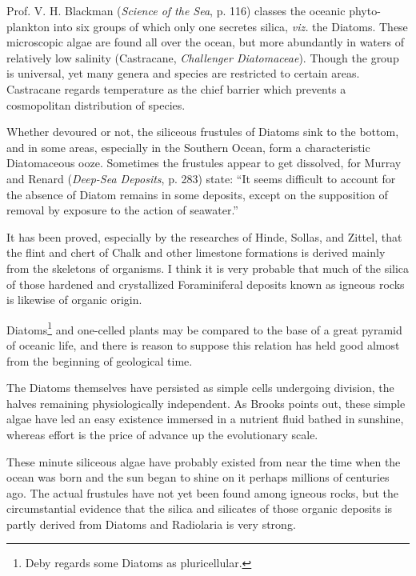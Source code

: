 \documentclass[a4paper, 12pt, oneside, landscape]{article}
\begin{document}
Prof. V. H. Blackman (\emph{Science of the Sea}, p. 116) classes the oceanic phyto-plankton into six groups of which only one secretes silica, \emph{viz.} the Diatoms. These microscopic algae are found all over the ocean, but more abundantly in waters of relatively low salinity (Castracane, \emph{Challenger Diatomaceae}). Though the group is universal, yet many genera and species are restricted to certain areas. Castracane regards temperature as the chief barrier which prevents a cosmopolitan distribution of species.

Whether devoured or not, the siliceous frustules of Diatoms sink to the bottom, and in some areas, especially in the Southern Ocean, form a characteristic Diatomaceous ooze. Sometimes the frustules appear to get dissolved, for Murray and Renard (\emph{Deep-Sea Deposits}, p. 283) state: ``It seems difficult to account for the absence of Diatom remains in some deposits, except on the supposition of removal by exposure to the action of seawater.''

It has been proved, especially by the researches of Hinde, Sollas, and Zittel, that the flint and chert of Chalk and other limestone formations is derived mainly from the skeletons of organisms. I think it is very probable that much of the silica of those hardened and crystallized Foraminiferal deposits known as igneous rocks is likewise of organic origin.

Diatoms\footnote{Deby regards some Diatoms as pluricellular.} and one-celled plants may be compared to the base of a great pyramid of oceanic life, and there is reason to suppose this relation has held good almost from the beginning of geological time.

The Diatoms themselves have persisted as simple cells undergoing division, the halves remaining physiologically independent. As Brooks points out, these simple algae have led an easy existence immersed in a nutrient fluid bathed in sunshine, whereas effort is the price of advance up the evolutionary scale.

These minute siliceous algae have probably existed from near the time when the ocean was born and the sun began to shine on it perhaps millions of centuries ago. The actual frustules have not yet been found among igneous rocks, but the circumstantial evidence that the silica and silicates of those organic deposits is partly derived from Diatoms and Radiolaria is very strong.
\end{document}
